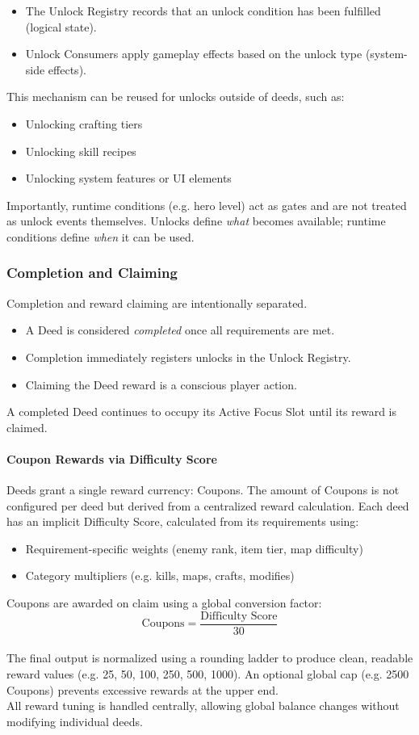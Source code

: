 \begin{itemize}
	\item The Unlock Registry records that an unlock condition has been fulfilled (logical state).
	\item Unlock Consumers apply gameplay effects based on the unlock type (system-side effects).
\end{itemize}
This mechanism can be reused for unlocks outside of deeds, such as:
\begin{itemize}
	\item Unlocking crafting tiers
	\item Unlocking skill recipes
	\item Unlocking system features or UI elements
\end{itemize}
Importantly, runtime conditions (e.g. hero level) act as gates and are not treated as unlock events themselves. Unlocks define \emph{what} becomes available; runtime conditions define \emph{when} it can be used.

\subsubsection{Completion and Claiming}

Completion and reward claiming are intentionally separated.

\begin{itemize}
	\item A Deed is considered \emph{completed} once all requirements are met.
	\item Completion immediately registers unlocks in the Unlock Registry.
	\item Claiming the Deed reward is a conscious player action.
\end{itemize}
A completed Deed continues to occupy its Active Focus Slot
until its reward is claimed.

\paragraph{Coupon Rewards via Difficulty Score}
Deeds grant a single reward currency: Coupons.
The amount of Coupons is not configured per deed but derived from a centralized reward calculation.
Each deed has an implicit Difficulty Score, calculated from its requirements using:
\begin{itemize}
	\item Requirement-specific weights (enemy rank, item tier, map difficulty)
	\item Category multipliers (e.g. kills, maps, crafts, modifies)
\end{itemize}
Coupons are awarded on claim using a global conversion factor:
\[
\text{Coupons} = \frac{\text{Difficulty Score}}{30}
\] \\
The final output is normalized using a rounding ladder to produce clean, readable reward values (e.g. 25, 50, 100, 250, 500, 1000).
An optional global cap (e.g. 2500 Coupons) prevents excessive rewards at the upper end.\\
All reward tuning is handled centrally, allowing global balance changes without modifying individual deeds.

